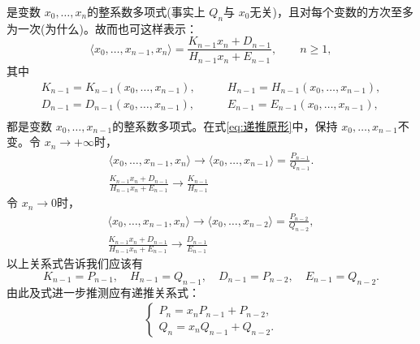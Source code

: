 是变数 \( x_0, \dots, x_n \)的整系数多项式(事实上 \( Q_n \)与 \( x_0
\)无关)，且对每个变数的方次至多为一次(为什么)。故而也可这样表示：
\begin{equation}\label{eq:递推原形}
	\langle x_0, \dots, x_{n-1}, x_n \rangle = \frac{K_{n-1}x_n + D_{n-1}}{H_{n-1}x_n + E_{n-1}}, \qquad n \geqslant 1,
\end{equation}
其中
\begin{align*}
	K_{n-1} = K_{n-1}(x_0, \dots, x_{n-1}),\qquad & H_{n-1} = H_{n-1} (x_0, \dots, x_{n-1}), \\
	D_{n-1} = D_{n-1}(x_0, \dots, x_{n-1}),\qquad & E_{n-1} = E_{n-1} (x_0, \dots, x_{n-1}), \\
\end{align*}
都是变数 \( x_0, \dots, x_{n-1} \)的整系数多项式。在式\eqref{eq:递推原形}中，保持 \( x_0, \dots, x_{n-1} \)不变。令 \(
x_n \to + \infty \)时，
\begin{gather*}
	\langle x_0, \dots, x_{n-1}, x_n \rangle \to \langle x_0, \dots, x_{n-1} \rangle = \frac{P_{n-1}}{Q_{n-1}}. \\
	\frac{K_{n-1}x_n + D_{n-1}}{H_{n-1}x_n + E_{n-1}} \to \frac{K_{n-1}}{H_{n-1}}
\end{gather*}
令 \( x_n \to 0 \)时，
\begin{gather*}
	\langle x_0, \dots, x_{n-1}, x_n \rangle \to \langle x_0, \dots, x_{n-2} \rangle = \frac{P_{n-2}} {Q_{n-2}}, \\
	\frac{K_{n-1}x_n + D_{n-1}}{H_{n-1}x_n + E_{n-1}} \to \frac{D_{n-1}}{E_{n-1}}
\end{gather*}
以上关系式告诉我们应该有
\begin{equation*}
	K_{n-1} = P_{n-1}, \quad H_{n-1} = Q_{n-1}, \quad D_{n-1} = P_{n-2}, \quad E_{n-1} = Q_{n-2}.
\end{equation*}
由此及式进一步推测应有递推关系式：
\begin{align}\label{eq:递推}
	\begin{cases}
		P_n  = x_nP_{n-1} + P_{n-2}, \\
		Q_n  = x_nQ_{n-1} + Q_{n-2}.
	\end{cases}
\end{align}

